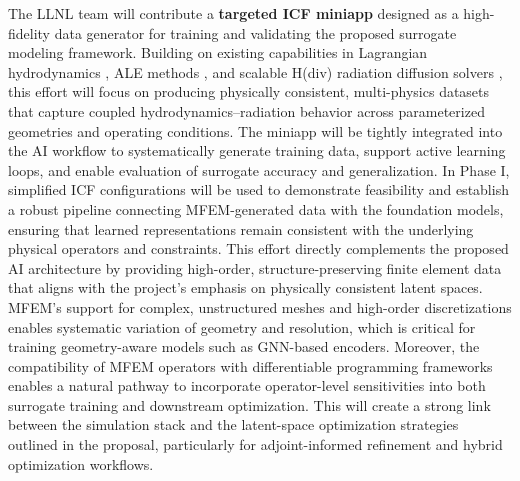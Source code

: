 The LLNL team will contribute a {\bf targeted ICF miniapp} designed as a
high-fidelity data generator for training and validating the proposed surrogate
modeling framework. Building on existing capabilities in Lagrangian
hydrodynamics \cite{Dobrev2012}, ALE methods \cite{Tomov2018}, and scalable
H(div) radiation diffusion solvers \cite{Pazner2025}, this effort will focus on
producing physically consistent, multi-physics datasets that capture coupled
hydrodynamics–radiation behavior across parameterized geometries and operating
conditions. The miniapp will be tightly integrated into the AI workflow to
systematically generate training data, support active learning loops, and
enable evaluation of surrogate accuracy and generalization. In Phase I,
simplified ICF configurations will be used to demonstrate feasibility and
establish a robust pipeline connecting MFEM-generated data with the foundation
models, ensuring that learned representations remain consistent with the
underlying physical operators and constraints.
This effort directly complements the proposed AI architecture by providing
high-order, structure-preserving finite element data that aligns with the
project’s emphasis on physically consistent latent spaces. MFEM’s support for
complex, unstructured meshes and high-order discretizations enables systematic
variation of geometry and resolution, which is critical for training
geometry-aware models such as GNN-based encoders. Moreover, the compatibility
of MFEM operators with differentiable programming frameworks enables a natural
pathway to incorporate operator-level sensitivities into both surrogate
training and downstream optimization. This will create a strong link between the
simulation stack and the latent-space optimization strategies outlined in the
proposal, particularly for adjoint-informed refinement and hybrid optimization
workflows.

